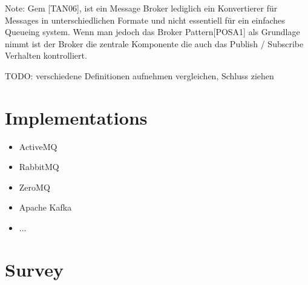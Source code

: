 Note: Gem [TAN06], ist ein Message Broker lediglich ein Konvertierer für
Messages in unterschiedlichen Formate und nicht essentiell für ein einfaches
Queueing system. Wenn man jedoch das Broker Pattern[POSA1] als Grundlage nimmt
ist der Broker die zentrale Komponente die auch das Publish / Subscribe
Verhalten kontrolliert. 

TODO: verschiedene Definitionen aufnehmen vergleichen, Schluss ziehen \\

\section{Implementations}
\begin{itemize}
	\item ActiveMQ 
	\item RabbitMQ
	\item ZeroMQ
	\item Apache Kafka
	\item ... 
\end{itemize}
\section{Survey}


